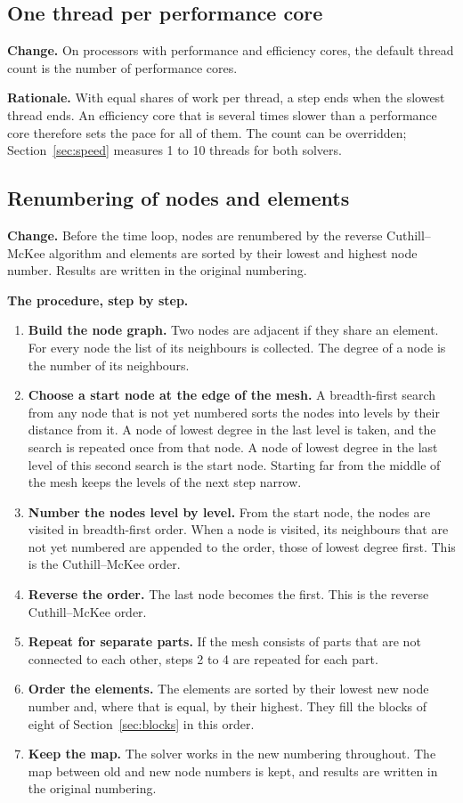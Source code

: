 \documentclass[11pt,a4paper]{article}
\begin{document}
\subsection{One thread per performance core}
\label{sec:pcores}

\textbf{Change.} On processors with performance and efficiency cores, the default thread count is the number of performance cores.

\textbf{Rationale.} With equal shares of work per thread, a step ends when the slowest thread ends. An efficiency core that is several times slower than a performance core therefore sets the pace for all of them. The count can be overridden; Section~\ref{sec:speed} measures 1 to 10 threads for both solvers.

\subsection{Renumbering of nodes and elements}
\label{sec:renumber}

\textbf{Change.} Before the time loop, nodes are renumbered by the reverse Cuthill--McKee algorithm \cite{cuthill1969} and elements are sorted by their lowest and highest node number. Results are written in the original numbering.

\textbf{The procedure, step by step.}
\begin{enumerate}
\item \textbf{Build the node graph.} Two nodes are adjacent if they share an element. For every node the list of its neighbours is collected. The degree of a node is the number of its neighbours.
\item \textbf{Choose a start node at the edge of the mesh.} A breadth-first search from any node that is not yet numbered sorts the nodes into levels by their distance from it. A node of lowest degree in the last level is taken, and the search is repeated once from that node. A node of lowest degree in the last level of this second search is the start node. Starting far from the middle of the mesh keeps the levels of the next step narrow.
\item \textbf{Number the nodes level by level.} From the start node, the nodes are visited in breadth-first order. When a node is visited, its neighbours that are not yet numbered are appended to the order, those of lowest degree first. This is the Cuthill--McKee order.
\item \textbf{Reverse the order.} The last node becomes the first. This is the reverse Cuthill--McKee order.
\item \textbf{Repeat for separate parts.} If the mesh consists of parts that are not connected to each other, steps 2 to 4 are repeated for each part.
\item \textbf{Order the elements.} The elements are sorted by their lowest new node number and, where that is equal, by their highest. They fill the blocks of eight of Section~\ref{sec:blocks} in this order.
\item \textbf{Keep the map.} The solver works in the new numbering throughout. The map between old and new node numbers is kept, and results are written in the original numbering.
\end{enumerate}
\end{document}
